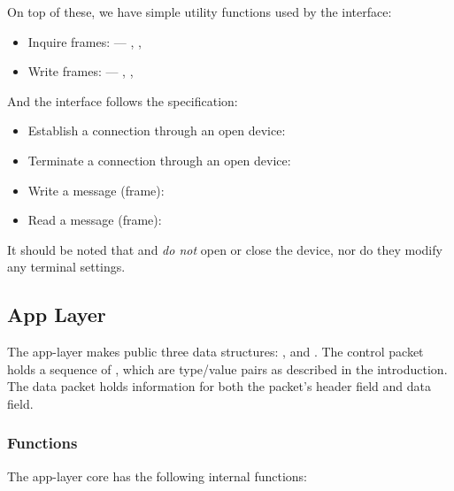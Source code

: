 \documentclass[main.tex]{subfiles}
\begin{document}
On top of these, we have simple utility functions used by the interface:

\begin{itemize}[noitemsep,rightmargin=3em]
\item Inquire frames:  ---
, , \textellipsis

\item Write frames:  ---
, , \textellipsis
\end{itemize}

And the interface follows the specification:

\begin{itemize}[noitemsep,rightmargin=3em]
\item Establish a connection through an open device:

\item Terminate a connection through an open device:

\item Write a message (frame):

\item Read a message (frame):
\end{itemize}

It should be noted that  and  \emph{do not} open or close the device, nor do they modify any terminal settings.

\subsection{App Layer}
\label{subsec:alarch}

The app-layer makes public three data structures: ,  and . The control packet holds a sequence of , which are type/value pairs as described in the introduction. The data packet holds information for both the packet's header field and data field.

\subsubsection{Functions}
\label{subsubsec:funcalarch}

The app-layer core has the following internal functions:
\end{document}
